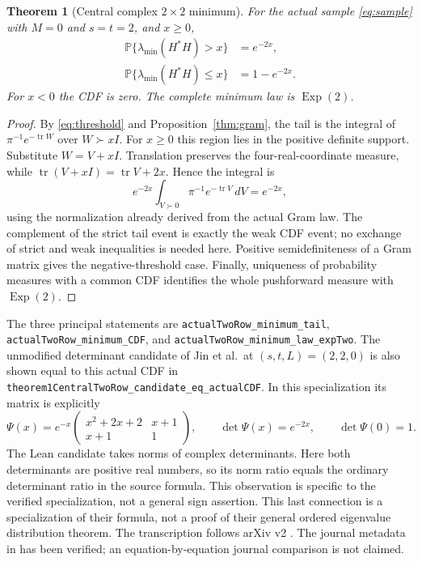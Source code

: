 \documentclass[11pt]{article}
\newtheorem{theorem}{Theorem}[section]
\newcommand{\Prob}{\mathbb P}
\newcommand{\tr}{\operatorname{tr}}
\newcommand{\pd}{\succ0}
\newcommand{\lean}[1]{{\small\nolinkurl{#1}}}
\begin{document}
\begin{theorem}[Central complex $2\times2$ minimum]\label{thm:minimum}
For the actual sample \eqref{eq:sample} with $M=0$ and $s=t=2$, and $x\geq0$,
\begin{align}
 \Prob\{\lambda_{\min}(H^*H)>x\}&=e^{-2x},\label{eq:tail}\\
 \Prob\{\lambda_{\min}(H^*H)\leq x\}&=1-e^{-2x}.\label{eq:cdf}
\end{align}
For $x<0$ the CDF is zero. The complete minimum law is
$\operatorname{Exp}(2)$.
\end{theorem}
\begin{proof}
By \eqref{eq:threshold} and Proposition~\ref{thm:gram}, the tail is the integral
of $\pi^{-1}e^{-\tr W}$ over $W\succ xI$. For $x\geq0$ this region lies in
the positive definite support. Substitute $W=V+xI$. Translation preserves
the four-real-coordinate measure, while
$\tr(V+xI)=\tr V+2x$. Hence the integral is
\[
 e^{-2x}\int_{V\pd}\pi^{-1}e^{-\tr V}\,dV=e^{-2x},
\]
using the normalization already derived from the actual Gram law.
The complement of the strict tail event is exactly the weak CDF event;
no exchange of strict and weak inequalities is needed here.
Positive semidefiniteness of a Gram matrix gives the negative-threshold case.
Finally, uniqueness of probability measures with a common CDF identifies the
whole pushforward measure with $\operatorname{Exp}(2)$.
\end{proof}

The three principal statements are \lean{actualTwoRow_minimum_tail},
\lean{actualTwoRow_minimum_CDF}, and
\lean{actualTwoRow_minimum_law_expTwo}.
The unmodified determinant candidate of Jin et al.\ at
$(s,t,L)=(2,2,0)$ is also shown equal to this actual CDF in
\lean{theorem1CentralTwoRow_candidate_eq_actualCDF}.
In this specialization its matrix is explicitly
\[
 \Psi(x)=e^{-x}\begin{pmatrix}x^2+2x+2&x+1\\x+1&1\end{pmatrix},
 \qquad \det\Psi(x)=e^{-2x},\qquad \det\Psi(0)=1.
\]
The Lean candidate takes norms of complex determinants. Here both
determinants are positive real numbers, so its norm ratio equals the
ordinary determinant ratio in the source formula. This observation is
specific to the verified specialization, not a general sign assertion.
This last connection is a specialization of their formula, not a proof of
their general ordered eigenvalue distribution theorem.
The transcription follows arXiv v2 \cite{jinpreprint}. The journal metadata in
\cite{jin} has been verified; an equation-by-equation journal comparison is
not claimed.
\end{document}
